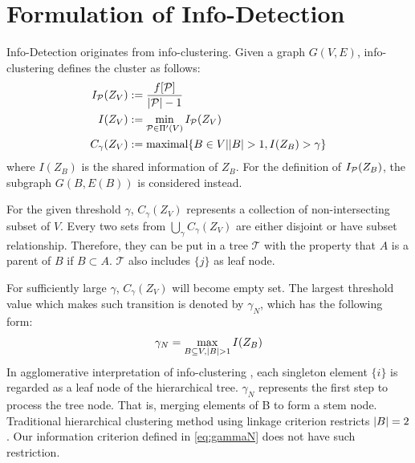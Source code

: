 \documentclass[runningheads]{llncs}
\begin{document}
\section{Formulation of Info-Detection}
Info-Detection originates from info-clustering. Given a graph $G(V,E)$, info-clustering defines the cluster as follows:
\begin{align}
I_{\P}(Z_V) & := \frac{ f[\P] }{  \abs{\mathcal{P}} - 1 }\\
I(Z_V) & := \min_{\mathcal{P} \in \Pi'(V)} I_{\mathcal{P}}(Z_V)  \label{eq:ms} \\
C_{\gamma}(Z_V) & := \textrm{maximal}\{ B \in V \vert \abs{B} > 1, I(Z_B) > \gamma \}
\end{align}
where $I(Z_B)$ is the shared information of $Z_B$. For the definition of $I_{\P}(Z_B)$, the subgraph $G(B,E(B))$ is considered instead.

For the given threshold $\gamma$, $C_{\gamma} (Z_V)$ represents a collection of non-intersecting subset of $V$. Every two sets from $\bigcup_{\gamma} C_{\gamma}(Z_V)$ are either disjoint or have subset relationship. Therefore, they can be put in a tree $\mathcal{T}$ with the property that $A$ is a parent of $B$ if $B\subset A$. $\mathcal{T}$ also includes $\{j\}$ as leaf node. 

For sufficiently large $\gamma$, $C_{\gamma} (Z_V)$ will become empty set. The largest threshold value which makes such transition is denoted by $\gamma_N$, which has the following form:
\begin{equation}\label{eq:gammaN}
\gamma_N = \max_{B\subseteq V, \abs{B}>1} I(Z_B)
\end{equation}
In agglomerative interpretation of info-clustering \cite{RN8}, each singleton element $\{i\}$ is regarded as a leaf node of the hierarchical tree. $\gamma_N$ represents the first step to process the tree node. That is, merging elements of B to form a stem node. Traditional hierarchical clustering method using linkage criterion restricts $\abs{B}=2$. Our information criterion defined in \eqref{eq:gammaN} does not have such restriction. 
\end{document}
